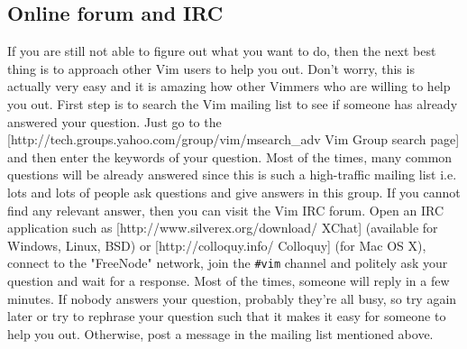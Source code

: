 \subsection{Online forum and IRC} 
If you are still not able to figure out
what you want to do, then the next best thing is to approach other Vim users to
help you out. Don't worry, this is actually very easy and it is amazing how
other Vimmers who are willing to help you out. First step is to search the Vim
mailing list to see if someone has already answered your question. Just go to
the [http://tech.groups.yahoo.com/group/vim/msearch\_adv Vim Group search page]
and then enter the keywords of your question. Most of the times, many common
questions will be already answered since this is such a high-traffic mailing
list i.e. lots and lots of people ask questions and give answers in this group.
If you cannot find any relevant answer, then you can visit the Vim IRC forum.
Open an IRC application such as [http://www.silverex.org/download/ XChat]
(available for Windows, Linux, BSD) or [http://colloquy.info/ Colloquy] (for
Mac OS X), connect to the "FreeNode" network, join the \texttt{\#vim} channel and
politely ask your question and wait for a response. Most of the times, someone
will reply in a few minutes. If nobody answers your question, probably they're
all busy, so try again later or try to rephrase your question such that it
makes it easy for someone to help you out. Otherwise, post a message in the
mailing list mentioned above.
